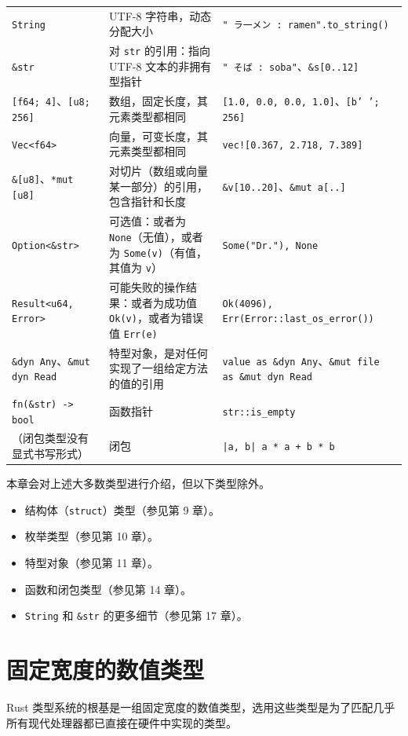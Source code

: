\begin{xltabular}{\textwidth}{@{}>{\hsize\raggedright\arraybackslash}X>{\hsize\raggedright\arraybackslash}X>{\hsize\raggedright\arraybackslash}X@{}}
\texttt{String} & UTF-8 字符串，动态分配大小 & \texttt{" ラ一メン : ramen".to\_string()} \\
\texttt{\&str} & 对 \texttt{str} 的引用：指向 UTF-8 文本的非拥有型指针 & \texttt{" そば : soba"}、\texttt{\&s[0..12]} \\
\texttt{[f64; 4]}、\texttt{[u8; 256]} & 数组，固定长度，其元素类型都相同 & \texttt{[1.0, 0.0, 0.0, 1.0]}、\texttt{[b' '; 256]} \\
\texttt{Vec<f64>} & 向量，可变长度，其元素类型都相同 & \texttt{vec![0.367, 2.718, 7.389]} \\
\texttt{\&[u8]}、\texttt{*mut [u8]} & 对切片（数组或向量某一部分）的引用，包含指针和长度 & \texttt{\&v[10..20]}、\texttt{\&mut a[..]} \\
\texttt{Option<\&str>} & 可选值：或者为 \texttt{None}（无值），或者为 \texttt{Some(v)}（有值，其值为 \texttt{v}） & \texttt{Some("Dr."), None} \\
\texttt{Result<u64, Error>} & 可能失败的操作结果：或者为成功值 \texttt{Ok(v)}，或者为错误值 \texttt{Err(e)} & \texttt{Ok(4096), Err(Error::last\_os\_error())} \\
\texttt{\&dyn Any}、\texttt{\&mut dyn Read} & 特型对象，是对任何实现了一组给定方法的值的引用 & \texttt{value as \&dyn Any}、\texttt{\&mut file as \&mut dyn Read} \\
\texttt{fn(\&str) -> bool} & 函数指针 & \texttt{str::is\_empty} \\
（闭包类型没有显式书写形式） & 闭包 & \texttt{|a, b| a * a + b * b} \\
\end{xltabular}
\myTableEnd

本章会对上述大多数类型进行介绍，但以下类型除外。

\begin{itemize}
\item 结构体（\texttt{struct}）类型（参见第 9 章）。
\item 枚举类型（参见第 10 章）。
\item 特型对象（参见第 11 章）。
\item 函数和闭包类型（参见第 14 章）。
\item \texttt{String} 和 \texttt{\&str} 的更多细节（参见第 17 章）。
\end{itemize}

\section{固定宽度的数值类型}

Rust 类型系统的根基是一组固定宽度的数值类型，选用这些类型是为了匹配几乎所有现代处理器都已直接在硬件中实现的类型。

